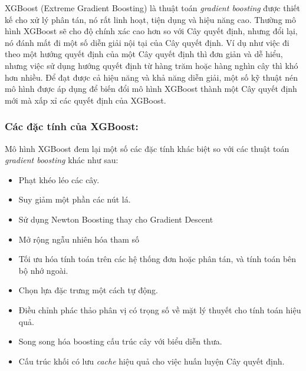 XGBoost (Extreme Gradient Boosting) là thuật toán \emph{gradient boosting} được thiết kế cho xử lý phân tán, nó rất linh hoạt, tiện dụng và hiệu năng cao. Thường mô hình XGBoost sẽ cho độ chính xác cao hơn so với Cây quyết định, nhưng đổi lại, nó đánh mất đi một số diễn giải nội tại của Cây quyết định. Ví dụ như việc đi theo một hướng quyết định của một Cây quyết định thì đơn giản và dễ hiểu, nhưng việc sử dụng hướng quyết định từ hàng trăm hoặc hàng nghìn cây thì khó hơn nhiều. Để đạt được cả hiệu năng và khả năng diễn giải, một số kỹ thuật nén mô hình được áp dụng để biến đổi mô hình XGBoost thành một Cây quyết định mới mà xấp xỉ các quyết định của XGBoost.

\subsubsection{Các đặc tính của XGBoost:}
Mô hình XGBoost đem lại một số các đặc tính khác biệt so với các thuật toán \emph{gradient boosting} khác như sau:
\begin{itemize}
    \item Phạt khéo léo các cây.
    \item Suy giảm một phần các nút lá.
    \item Sử dụng Newton Boosting thay cho Gradient Descent
    \item Mở rộng ngẫu nhiên hóa tham số
    \item Tối ưu hóa tính toán trên các hệ thống đơn hoặc phân tán, và tính toán bên bộ nhớ ngoài.
    \item Chọn lựa đặc trưng một cách tự động.
    \item Điều chỉnh phác thảo phân vị có trọng số về mặt lý thuyết cho tính toán hiệu quả.
    \item Song song hóa boosting cấu trúc cây với biểu diễn thưa.
    \item Cấu trúc khối có lưu \emph{cache} hiệu quả cho việc huấn luyện Cây quyết định.
\end{itemize}

